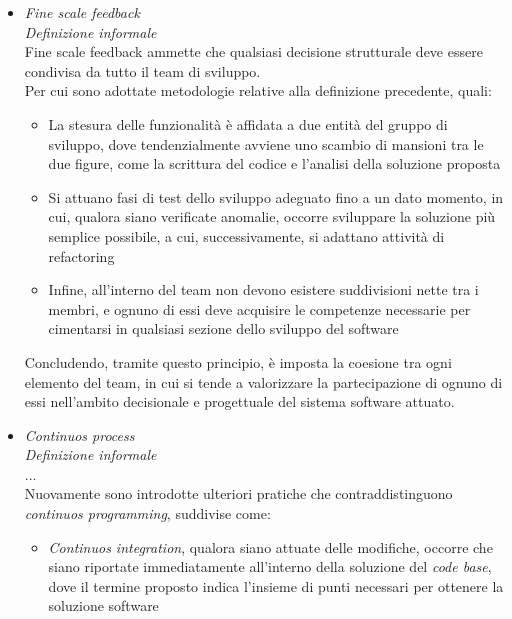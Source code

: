 \documentclass{article}
\begin{document}
\begin{itemize}[label={-}]
    \item \textit{Fine scale feedback}\vspace*{7pt}\\
    \textit{Definizione informale}\\
    Fine scale feedback ammette che qualsiasi decisione strutturale deve essere condivisa da tutto il team di sviluppo.\vspace*{7pt}\\
    Per cui sono adottate metodologie relative alla definizione precedente, quali:
    \begin{itemize}
        \item La stesura delle funzionalità è affidata a due entità del gruppo di sviluppo, dove tendenzialmente avviene uno scambio di mansioni tra le due figure, come la scrittura del codice e l'analisi della soluzione proposta
        \item Si attuano fasi di test dello sviluppo adeguato fino a un dato momento, in cui, qualora siano verificate anomalie, occorre sviluppare la soluzione più semplice possibile, a cui, successivamente, si adattano attività di refactoring
        \item Infine, all'interno del team non devono esistere suddivisioni nette tra i membri, e ognuno di essi deve acquisire le competenze necessarie per cimentarsi in qualsiasi sezione dello sviluppo del software
    \end{itemize}
    Concludendo, tramite questo principio, è imposta la coesione tra ogni elemento del team, in cui si tende a valorizzare la partecipazione di ognuno di essi nell'ambito decisionale e progettuale del sistema software attuato.
    \item \textit{Continuos process}\vspace*{7pt}\\
    \textit{Definizione informale}\\
    ...\vspace*{7pt}\\
    Nuovamente sono introdotte ulteriori pratiche che contraddistinguono \textit{continuos programming}, suddivise come:
    \begin{itemize}
        \item \textit{Continuos integration}, qualora siano attuate delle modifiche, occorre che siano riportate immediatamente all'interno della soluzione del \textit{code base}, dove il termine proposto indica l'insieme di punti necessari per ottenere la soluzione software

\end{itemize}
\end{itemize}
\end{document}
